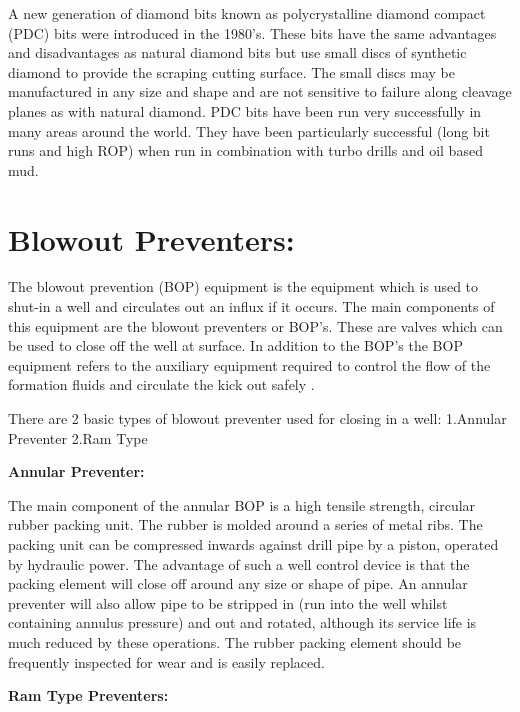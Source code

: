  A new generation of diamond bits
known as polycrystalline diamond compact (PDC)
bits were introduced in the 1980’s. These bits have
the same advantages and disadvantages as natural
diamond bits but use small discs of synthetic
diamond to provide the scraping cutting surface. The
small discs may be manufactured in any size and
shape and are not sensitive to failure along cleavage
planes as with natural diamond. PDC bits have been
run very successfully in many areas around the
world. They have been particularly successful (long
bit runs and high ROP) when run in combination with
turbo drills and oil based mud.

\vspace{1em}

\section*{Blowout Preventers:}

The blowout prevention (BOP)
equipment is the equipment which is used to shut-in a
well and circulates out an influx if it occurs. The
main components of this equipment are the blowout
preventers or BOP's. These are valves which can be
used to close off the well at surface. In addition to the
BOP's the BOP equipment refers to the auxiliary
equipment required to control the flow of the
formation fluids and circulate the kick out safely .

\vspace{1em}


There are 2 basic types of blowout preventer used for closing in a
well:
 1.Annular Preventer
 2.Ram Type

\textbf{Annular Preventer:}

 The main component of the
annular BOP is a high tensile strength, circular rubber
packing unit. The rubber is molded around a series of
metal ribs. The packing unit can be compressed
inwards against drill pipe by a piston, operated by
hydraulic power. The advantage of such a well
control device is that the packing element will close
off around any size or shape of pipe. An annular
preventer will also allow pipe to be stripped in (run
into the well whilst containing annulus pressure) and
out and rotated, although its service life is much
reduced by these operations. The rubber packing
element should be frequently inspected for wear and
is easily replaced.

\vspace{1em}

\textbf{Ram Type Preventers:}

